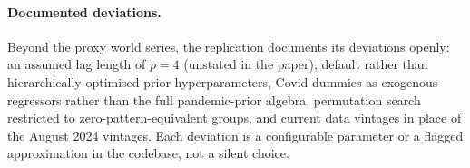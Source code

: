 \paragraph{Documented deviations.} Beyond the proxy world series, the replication documents its deviations openly: an assumed lag length of $p=4$ (unstated in the paper), default rather than hierarchically optimised prior hyperparameters, Covid dummies as exogenous regressors rather than the full pandemic-prior algebra, permutation search restricted to zero-pattern-equivalent groups, and current data vintages in place of the August 2024 vintages. Each deviation is a configurable parameter or a flagged approximation in the codebase, not a silent choice.
